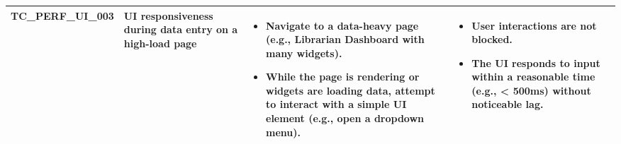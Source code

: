 \documentclass[10pt, a4paper]{report}
\begin{document}
\begin{longtable}{|>{\raggedright\arraybackslash}p{3.5cm}|>{\raggedright\arraybackslash}p{4cm}|>{\raggedright\arraybackslash}p{5cm}|>{\raggedright\arraybackslash}p{5.5cm}|}
TC\_PERF\_UI\_003 & UI responsiveness during data entry on a high-load page & 
    \begin{itemize}[noitemsep, topsep=0pt, partopsep=0pt, leftmargin=*]
        \item Navigate to a data-heavy page (e.g., Librarian Dashboard with many widgets).
        \item While the page is rendering or widgets are loading data, attempt to interact with a simple UI element (e.g., open a dropdown menu).
    \end{itemize} & 
    \begin{itemize}[noitemsep, topsep=0pt, partopsep=0pt, leftmargin=*]
        \item User interactions are not blocked.
        \item The UI responds to input within a reasonable time (e.g., < 500ms) without noticeable lag.
    \end{itemize} \\ \hline


\end{longtable}
\end{document}
